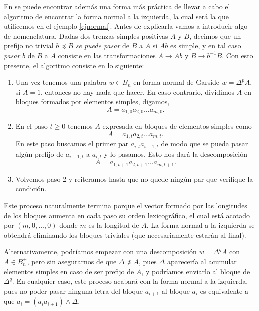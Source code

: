 \documentclass[bibtex, anon]{TEMat-article}
\begin{document}
En \cite{Thurston} se puede encontrar además una forma más práctica de llevar a cabo el algoritmo de encontrar la forma normal a la izquierda, la cual será la que utilicemos en el ejemplo \ref{ejnormal}. Antes de explicarla vamos a introducir algo de nomenclatura. Dadas dos trenzas simples positivas $A$ y $B$, decimos que un prefijo no trivial $b\preccurlyeq B$ \emph{se puede pasar} de $B$ a $A$ si $Ab$ es simple, y en tal caso \emph{pasar} $b$ de $B$ a $A$ consiste en las transformaciones $A\to Ab$ y $B\to b^{-1}B$. Con esto presente, el algoritmo consiste en lo siguiente:
\begin{enumerate}
	\item Una vez tenemos una palabra $w\in B_n$ en forma normal de Garside $w=\Delta^p A$, si $A=1$, entonces no hay nada que hacer. En caso contrario, dividimos $A$ en bloques formados por elementos simples, digamos, $$A=a_{1,0}a_{2,0}\dots a_{m,0}.$$
	\item En el paso $t\geq 0$ tenemos $A$ expresada en bloques de elementos simples como
	$$A=a_{1,t}a_{2,t}\dots a_{m,t}.$$
	En este paso buscamos el primer par $a_{i,t}a_{i+1,t}$ de modo que se pueda pasar algún prefijo de $a_{i+1,t}$ a $a_{i,t}$ y lo pasamos. Esto nos dará la descomposición 
	$$A=a_{1,t+1}a_{2,t+1}\dots a_{m,t+1}.$$
	\item Volvemos paso 2 y reiteramos hasta que no quede ningún par que verifique la condición. 
\end{enumerate} 

Este proceso naturalmente termina porque el vector formado por las longitudes de los bloques aumenta en cada paso su orden lexicográfico, el cual está acotado por $(m,0,\dots, 0)$ donde $m$ es la longitud de $A$. La forma normal a la izquierda se obtendrá eliminando los bloques triviales (que necesariamente estarán al final). %

Alternativamente, podríamos empezar con una descomposición $w=\Delta^qA$ con $A\in B_n^+$, pero sin asegurarnos de que $\Delta \not\preccurlyeq A$, pues $\Delta$ aparecería al acumular elementos simples en caso de ser prefijo de $A$, y podríamos enviarlo al bloque de $\Delta^q$. En cualquier caso, este proceso acabará con la forma normal a la izquierda, pues no poder pasar ninguna letra del bloque $a_{i+1}$ al bloque $a_i$ es equivalente a que $a_i=(a_ia_{i+1})\land \Delta$. 
\end{document}

